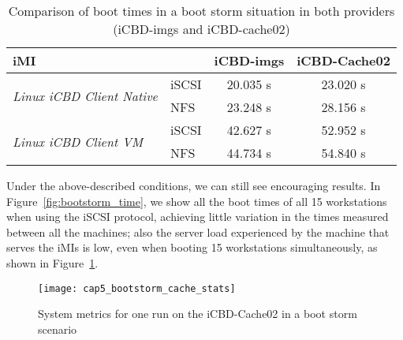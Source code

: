 \begin{table}[h]
\centering
\begin{tabular}{llcc}
\textbf{iMI} & \textbf{} & \textbf{iCBD-imgs} & \textbf{iCBD-Cache02} \\ \hline
\multirow{2}{*}{\textit{Linux iCBD Client Native}} & iSCSI & 20.035 s & 23.020 s \\
 & NFS & 23.248 s & 28.156 s \\ \hline
\multirow{2}{*}{\textit{Linux iCBD Client VM}} & iSCSI & 42.627 s & 52.952 s \\
 & NFS & 44.734 s & 54.840 s
\end{tabular}
	\caption{Comparison of boot times in a boot storm situation in both providers (iCBD-imgs and iCBD-cache02)}
	\label{tab:bootstorm_both}
\end{table}



Under the above-described conditions, we can still see encouraging results. In Figure~\ref{fig:bootstorm_time}, we show all the boot times of all 15 workstations when using the iSCSI protocol, achieving little variation in the times measured between all the machines; also the server load experienced by the machine that serves the iMIs is low, even when booting 15 workstations simultaneously, as shown in Figure~\ref{fig:bootstorm_cache_stats}.


\begin{figure}[htbp]
	\centering
	\texttt{[image: cap5\_bootstorm\_cache\_stats]}
	\caption{System metrics for one run on the iCBD-Cache02 in a boot storm scenario}
	\label{fig:bootstorm_cache_stats}
\end{figure}



